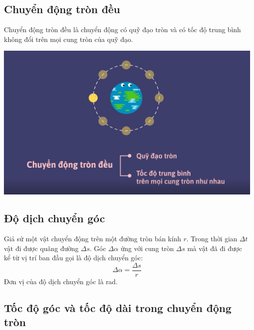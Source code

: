 \subsection{Chuyển động tròn đều}
Chuyển động tròn đều là chuyển động có quỹ đạo tròn và có tốc độ trung bình không đổi trên mọi cung tròn của quỹ đạo. 
\begin{center}
	\includegraphics[scale=0.3]{../figs/VN10-PH-06-L-005-1-V2-03.jpg}
\end{center}
\subsection{Độ dịch chuyển góc}
Giả sử một vật chuyển động trên một đường tròn bán kính $r$. Trong thời gian $\Delta t$ vật đi được quãng đường $\Delta s$. Góc $\Delta \alpha$ ứng với cung tròn $\Delta s$ mà vật đã đi được kể từ vị trí ban đầu gọi là độ dịch chuyển góc:
$$\Delta \alpha = \dfrac{\Delta s}{r}$$
Đơn vị của độ dịch chuyển góc là rad.
\subsection{Tốc độ góc và tốc độ dài trong chuyển động tròn}
